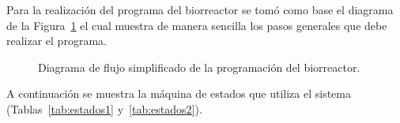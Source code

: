 \documentclass[11pt,tesis,twoside,openright,spanish]{upiiztt}
\begin{document}
Para la realización del programa del biorreactor se tomó como base el diagrama de
la Figura~\ref{fig:flujo_simplificado} el cual muestra de manera sencilla los pasos generales que debe
realizar el programa.

\begin{figure}[H]
  \centering
  \caption{Diagrama de flujo simplificado de la programación del biorreactor.}
  \label{fig:flujo_simplificado}
\end{figure}

A continuación se muestra la máquina de estados que utiliza el sistema (Tablas~\ref{tab:estados1} y~\ref{tab:estados2}).
\end{document}
